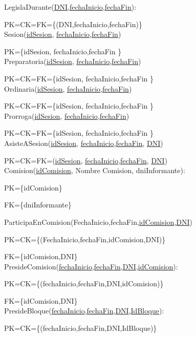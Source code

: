 LegislaDurante(\underline{DNI},\underline{fechaInicio},\underline{fechaFin}):

PK=CK=FK={\{(DNI,fechaInicio,fechaFin)}\}\\

Sesion(\underline{idSesion}, \underline{fechaInicio},\underline{fechaFin})

PK={\{idSesion, fechaInicio,fechaFin }\}\\

Preparatoria(\underline{idSesion}, \underline{fechaInicio},\underline{fechaFin})

PK=CK=FK={\{idSesion, fechaInicio,fechaFin }\}\\

Ordinaria(\underline{idSesion}, \underline{fechaInicio},\underline{fechaFin})

PK=CK=FK={\{idSesion, fechaInicio,fechaFin }\}\\

Prorroga(\underline{idSesion}, \underline{fechaInicio},\underline{fechaFin})

PK=CK=FK={\{idSesion, fechaInicio,fechaFin }\}\\

AsisteASesion(\underline{idSesion}, \underline{fechaInicio},\underline{fechaFin}, \underline{DNI})

PK=CK=FK=(\underline{idSesion}, \underline{fechaInicio},\underline{fechaFin}, \underline{DNI})\\

Comision(\underline{idComision}, Nombre Comision, dniInformante):

PK={\{idComision}\}

FK={\{dniInformante}\}

ParticipaEnComision(FechaInicio,fechaFin,\underline{idComision},\underline{DNI})

PK=CK={\{(FechaInicio,fechaFin,idComision,DNI)}\}

FK={\{idComision,DNI}\}\\

PresideComision(\underline{fechaInicio},\underline{fechaFin},\underline{DNI},\underline{idComision}):

PK=CK={\{(fechaInicio,fechaFin,DNI,idComision)}\}

FK={\{idComision,DNI}\}\\

PresideBloque(\underline{fechaInicio},\underline{fechaFin},\underline{DNI},\underline{IdBloque}):

PK=CK={\{(fechaInicio,fechaFin,DNI,IdBloque)}\}

